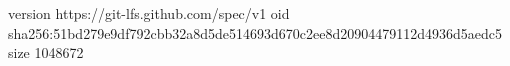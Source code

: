 version https://git-lfs.github.com/spec/v1
oid sha256:51bd279e9df792cbb32a8d5de514693d670c2ee8d20904479112d4936d5aedc5
size 1048672
